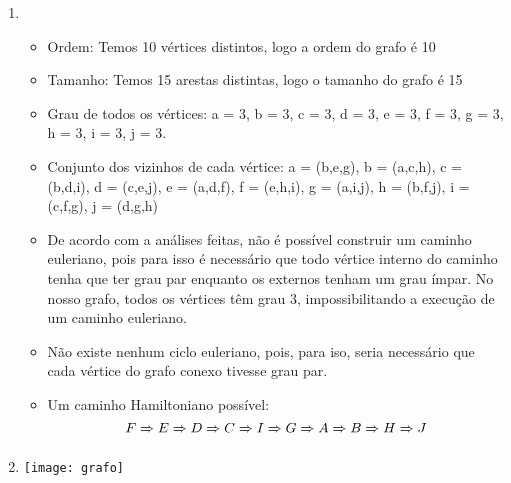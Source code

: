 \documentclass[11pt,reqno]{amsart}
\begin{document}
\begin{enumerate}
\item 
\begin{itemize}
	\item Ordem: Temos 10 vértices distintos, logo a ordem do grafo é 10
	\item Tamanho: Temos 15 arestas distintas, logo o tamanho do grafo é 15
	\item Grau de todos os vértices: a = 3, b = 3, c = 3, d = 3, e = 3, f = 3, g = 3, h = 3, i = 3, j = 3.
	\item Conjunto dos vizinhos de cada vértice: a = (b,e,g), b = (a,c,h), c = (b,d,i), d = (c,e,j), e = (a,d,f), f = (e,h,i), 
	g = (a,i,j), h = (b,f,j), i = (c,f,g), j = (d,g,h)
	\item De acordo com a análises feitas, não é possível construir um caminho euleriano, pois para isso é necessário que todo vértice 
	interno do caminho tenha que ter grau par enquanto os externos tenham um grau ímpar. No nosso grafo, todos os vértices têm grau 3, 
	impossibilitando a execução de um caminho euleriano.
	\item Não existe nenhum ciclo euleriano, pois, para iso, seria necessário que cada vértice do grafo conexo tivesse grau par.
	\item Um caminho Hamiltoniano possível:\\\[F \xRightarrow[ ]{ } E \xRightarrow[ ]{ } D \xRightarrow[ ]{ } C \xRightarrow[ ]{ } I \xRightarrow[ ]{ } G \xRightarrow[ ]{ } A \xRightarrow[ ]{ } B \xRightarrow[ ]{ } H \xRightarrow[ ]{ } J\]
\end{itemize}
\vspace{0.3cm}


\item \texttt{[image: grafo]}
\vspace{0.3cm}


\end{enumerate}
\end{document}
